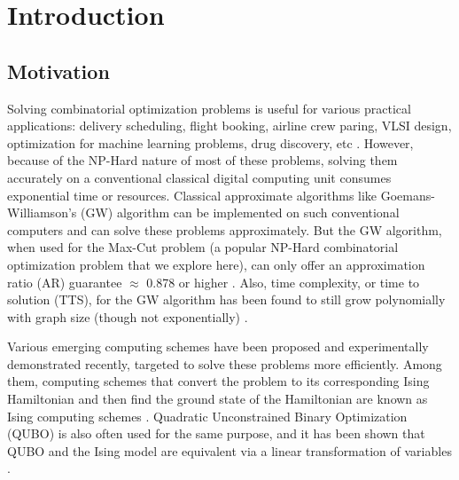\documentclass[10pt]{article}
\begin{document}
%
%
%
% 
%


\section{Introduction}

\subsection{Motivation}

Solving combinatorial optimization problems is useful for various practical applications: delivery scheduling, flight booking, airline crew paring, VLSI design, optimization for machine learning problems, drug discovery, etc \cite{CombApp1,CombApp2,RingOscApp}. However, because of the NP-Hard nature of most of these problems, solving them accurately on a conventional classical digital computing unit consumes exponential time or resources. Classical approximate algorithms like Goemans-Williamson's (GW) algorithm can be implemented on such conventional computers and can solve these problems approximately. But the GW algorithm, when used for the Max-Cut problem (a popular NP-Hard combinatorial optimization problem that we explore here), can only offer an approximation ratio (AR) guarantee  $\approx$ 0.878 or higher \cite{GW1}. Also, time complexity, or time to solution (TTS), for the GW algorithm has been found to still grow polynomially with graph size (though not exponentially) \cite{GWvsSAvsCIM}. 




Various emerging computing schemes have been proposed and experimentally demonstrated recently, targeted to solve these problems more efficiently. Among them,  computing schemes that convert the problem to its corresponding Ising Hamiltonian \cite{NPCompleteIsingFormulation} and then find the ground state of the Hamiltonian are known as Ising computing schemes \cite{IsingComputingReview}. Quadratic Unconstrained Binary Optimization (QUBO) is also often used for the same purpose, and it has been shown that QUBO and the Ising model are equivalent via a linear transformation of variables \cite{Spin_Akerman1}.  
\end{document}
